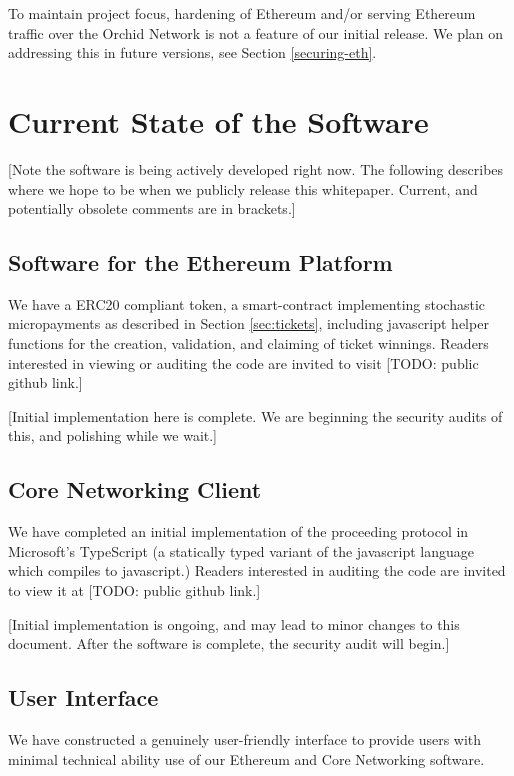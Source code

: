 \documentclass{article}
\newcommand{\orchid}{Orchid}
\newcommand{\Orchid}{\orchid}
\begin{document}
To maintain project focus, hardening of Ethereum and/or serving
Ethereum traffic over the \Orchid{} Network is not a feature of our
initial release. We plan on addressing this in future versions, see
Section \ref{securing-eth}.

\section{Current State of the Software}
\label{sec:current}

[Note the software is being actively developed right now. The
  following describes where we hope to be when we publicly release
  this whitepaper. Current, and potentially obsolete comments are in
  brackets.]

\subsection{Software for the Ethereum Platform}

We have a ERC20 compliant token, a smart-contract implementing
stochastic micropayments as described in Section \ref{sec:tickets},
including javascript helper functions for the creation, validation,
and claiming of ticket winnings. Readers interested in viewing or
auditing the code are invited to visit [TODO: public github link.]

[Initial implementation here is complete. We are beginning the
  security audits of this, and polishing while we wait.]

\subsection{Core Networking Client}

We have completed an initial implementation of the proceeding protocol
in Microsoft's TypeScript (a statically typed variant of the
javascript language which compiles to javascript.) Readers interested
in auditing the code are invited to view it at [TODO: public github link.]

[Initial implementation is ongoing, and may lead to minor changes to
  this document. After the software is complete, the security audit
  will begin.]

\subsection{User Interface}

We have constructed a genuinely user-friendly interface to provide
users with minimal technical ability use of our Ethereum and Core
Networking software.
\end{document}
